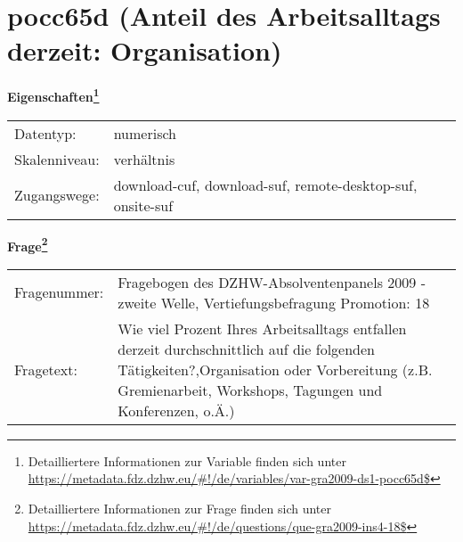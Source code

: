 
    \setcounter{footnote}{0}

    \vspace*{-1.8cm}
	\section{pocc65d (Anteil des Arbeitsalltags derzeit: Organisation)}
	\label{section:pocc65d}



    \vspace*{0.5cm}
    \noindent\textbf{Eigenschaften\footnote{Detailliertere Informationen zur Variable finden sich unter
		\url{https://metadata.fdz.dzhw.eu/\#!/de/variables/var-gra2009-ds1-pocc65d$}}}\\
	\begin{tabularx}{\hsize}{@{}lX}
	Datentyp: & numerisch \\
	Skalenniveau: & verhältnis \\
	Zugangswege: &
	  download-cuf, 
	  download-suf, 
	  remote-desktop-suf, 
	  onsite-suf
 \\
    \end{tabularx}



				\vspace*{0.5cm}
                \noindent\textbf{Frage\footnote{Detailliertere Informationen zur Frage finden sich unter
		              \url{https://metadata.fdz.dzhw.eu/\#!/de/questions/que-gra2009-ins4-18$}}}\\
				\begin{tabularx}{\hsize}{@{}lX}
					Fragenummer: &
					  Fragebogen des DZHW-Absolventenpanels 2009 - zweite Welle, Vertiefungsbefragung Promotion:
					  18
 \\
					Fragetext: & Wie viel Prozent Ihres Arbeitsalltags entfallen derzeit durchschnittlich auf die folgenden Tätigkeiten?,Organisation oder Vorbereitung (z.B. Gremienarbeit, Workshops, Tagungen und Konferenzen, o.Ä.) \\
				\end{tabularx}





